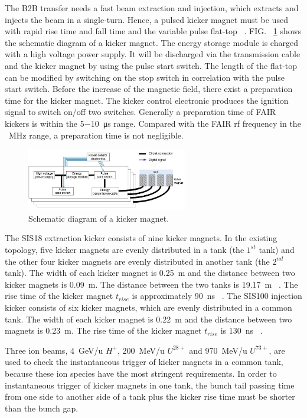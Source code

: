 The B2B transfer needs a fast beam extraction and injection, which extracts and injects the beam in a single-turn. Hence, a pulsed kicker magnet must be used with rapid rise time and fall time and the variable pulse flat-top ~\cite{petzenhauser_concept_2016}. FIG. ~\ref{SIS18_kicker} shows the schematic diagram of a kicker magnet. The energy storage module is charged with a high voltage power supply. It will be discharged via the transmission cable and the kicker magnet by using the pulse start switch. The length of the flat-top can be modified by switching on the stop switch in correlation with the pulse start switch. Before the increase of the magnetic field, there exist a preparation time for the kicker magnet. The kicker control electronic produces the ignition signal to switch on/off two switches. Generally a preparation time of FAIR kickers is within the \SI{5}{}$-$\SI{10}{\micro\second} range. Compared with the FAIR rf frequency in the \SI{}{MHz} range, a preparation time is not negligible.
\begin{figure}[!htb]
   \centering   
   \includegraphics*[width=70mm]{SIS18_kicker.jpg}
   \caption{Schematic diagram of a kicker magnet.}
   \label{SIS18_kicker}
\end{figure}


The SIS18 extraction kicker consists of nine kicker magnets. In the existing topology, five kicker magnets are evenly distributed in a tank (the $1^{st}$ tank) and the other four kicker magnets are evenly distributed in another tank (the $2^{nd}$ tank). The width of each kicker magnet is \SI{0.25}{m} and the distance between two kicker magnets is \SI{0.09}{m}. The distance between the two tanks is \SI{19.17}{m} ~\cite{ros_sis18_2008}. The rise time of the kicker magnet $t_\mathit{rise}$ is approximately \SI{90}{ns} ~\cite{blell_f-ds-ie-03e_2014}. The SIS100 injection kicker consists of six kicker magnets, which are evenly distributed in a common tank. The width of each kicker magnet is \SI{0.22}{m} and the distance between two magnets is \SI{0.23}{m}. The rise time of the kicker magnet $t_\mathit{rise}$ is \SI{130}{ns} ~\cite{blell_f-ds-ie-03e_2014}. 

Three ion beams, \SI{4}{GeV/u} $H^+$, \SI{200}{MeV/u} $U^{28+}$ and \SI{970}{MeV/u} $U^{73+}$, are used to check the instantaneous trigger of kicker magnets in a common tank, because these ion species have the most stringent requirements. In order to instantaneous trigger of kicker magnets in one tank, the bunch tail passing time from one side to another side of a tank plus the kicker rise time must be shorter than the bunch gap.

